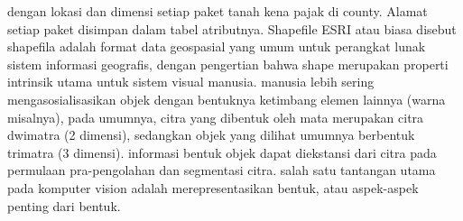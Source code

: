 dengan lokasi dan dimensi setiap paket tanah kena pajak di county. Alamat setiap paket disimpan dalam tabel atributnya.
Shapefile ESRI atau biasa disebut shapefila adalah format data geospasial yang umum untuk perangkat lunak sistem informasi geografis, dengan pengertian bahwa shape merupakan properti intrinsik utama untuk sistem visual manusia. manusia lebih sering mengasosialisasikan objek dengan bentuknya ketimbang elemen lainnya (warna misalnya), pada umumnya, citra yang dibentuk oleh mata merupakan citra dwimatra (2 dimensi), sedangkan objek yang dilihat umumnya berbentuk trimatra (3 dimensi). informasi bentuk objek dapat diekstansi dari citra pada permulaan pra-pengolahan dan segmentasi citra. salah satu tantangan utama pada komputer vision adalah merepresentasikan bentuk, atau aspek-aspek penting dari bentuk.

